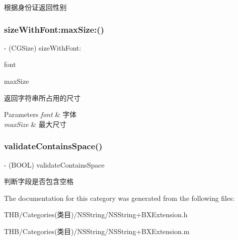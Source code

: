 根据身份证返回性别 \mbox{\label{category_n_s_string_07_b_x_extension_08_a8cc6fa8637ddcd726ba3b02a9f3a744d}} 
\subsubsection{\texorpdfstring{size\+With\+Font\+:max\+Size\+:()}{sizeWithFont:maxSize:()}}
{\footnotesize\ttfamily -\/ (C\+G\+Size) size\+With\+Font\+: \begin{DoxyParamCaption}\item[{(U\+I\+Font $\ast$)}]{font }\item[{maxSize:(C\+G\+Size)}]{max\+Size }\end{DoxyParamCaption}}

返回字符串所占用的尺寸


\begin{DoxyParams}{Parameters}
{\em font} & 字体 \\
\hline
{\em max\+Size} & 最大尺寸 \\
\hline
\end{DoxyParams}
\mbox{\label{category_n_s_string_07_b_x_extension_08_a5873d41b48f9dbf21299b31fdbf1ec0c}} 
\subsubsection{\texorpdfstring{validate\+Contains\+Space()}{validateContainsSpace()}}
{\footnotesize\ttfamily -\/ (B\+O\+OL) validate\+Contains\+Space \begin{DoxyParamCaption}{ }\end{DoxyParamCaption}}

判断字段是否包含空格 

The documentation for this category was generated from the following files\+:\begin{DoxyCompactItemize}
\item 
T\+H\+B/\+Categories(类目)/\+N\+S\+String/N\+S\+String+\+B\+X\+Extension.\+h\item 
T\+H\+B/\+Categories(类目)/\+N\+S\+String/N\+S\+String+\+B\+X\+Extension.\+m\end{DoxyCompactItemize}
